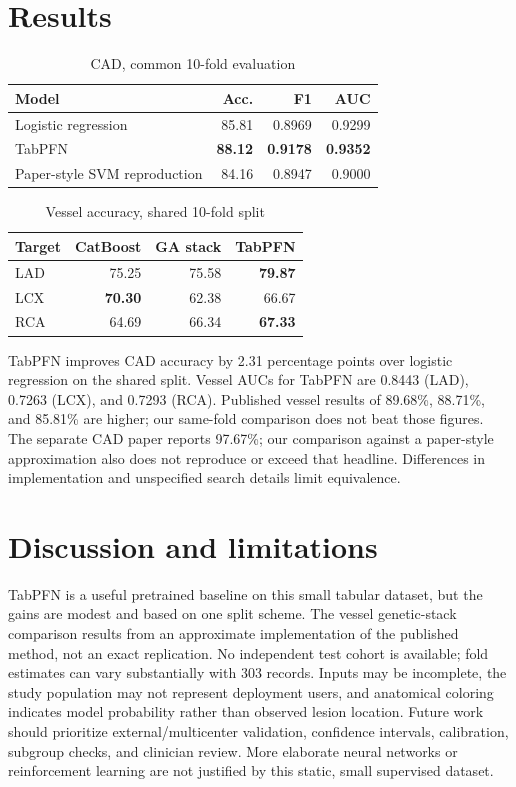 \documentclass[9pt,twocolumn]{article}
\begin{document}
\section{Results}
\begin{table}[h]\centering\small\caption{CAD, common 10-fold evaluation}\begin{tabular}{lrrr}\toprule Model&Acc.&F1&AUC\\\midrule Logistic regression&85.81&0.8969&0.9299\\TabPFN&\textbf{88.12}&\textbf{0.9178}&\textbf{0.9352}\\Paper-style SVM reproduction&84.16&0.8947&0.9000\\\bottomrule\end{tabular}\end{table}
\begin{table}[h]\centering\small\caption{Vessel accuracy, shared 10-fold split}\begin{tabular}{lrrr}\toprule Target&CatBoost&GA stack&TabPFN\\\midrule LAD&75.25&75.58&\textbf{79.87}\\LCX&\textbf{70.30}&62.38&66.67\\RCA&64.69&66.34&\textbf{67.33}\\\bottomrule\end{tabular}\end{table}
TabPFN improves CAD accuracy by 2.31 percentage points over logistic regression on the shared split. Vessel AUCs for TabPFN are 0.8443 (LAD), 0.7263 (LCX), and 0.7293 (RCA). Published vessel results of 89.68\%, 88.71\%, and 85.81\% are higher; our same-fold comparison does not beat those figures. The separate CAD paper reports 97.67\%; our comparison against a paper-style approximation also does not reproduce or exceed that headline. Differences in implementation and unspecified search details limit equivalence.
\section{Discussion and limitations}
TabPFN is a useful pretrained baseline on this small tabular dataset, but the gains are modest and based on one split scheme. The vessel genetic-stack comparison results from an approximate implementation of the published method, not an exact replication. No independent test cohort is available; fold estimates can vary substantially with 303 records. Inputs may be incomplete, the study population may not represent deployment users, and anatomical coloring indicates model probability rather than observed lesion location. Future work should prioritize external/multicenter validation, confidence intervals, calibration, subgroup checks, and clinician review. More elaborate neural networks or reinforcement learning are not justified by this static, small supervised dataset.
\end{document}
